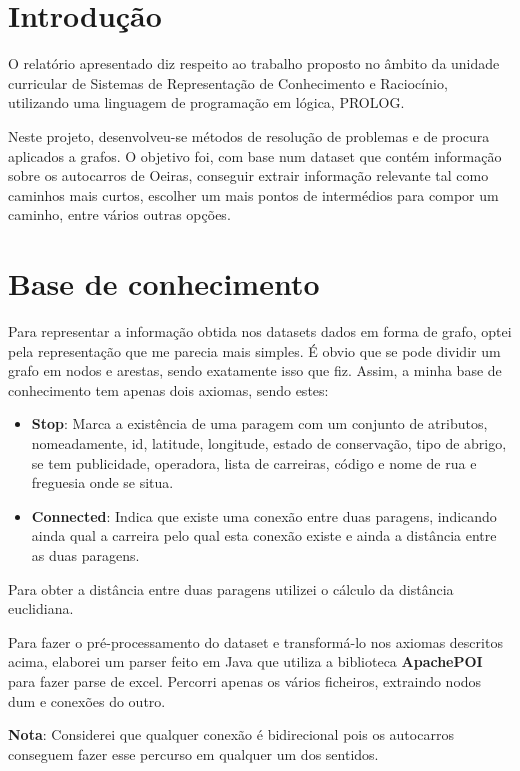 \documentclass[20pt]{article}
\begin{document}
\newpage
\tableofcontents
\newpage
\section{Introdução}

O relatório apresentado diz respeito ao trabalho proposto no âmbito da unidade curricular de Sistemas de Representação de Conhecimento e Raciocínio, utilizando uma linguagem de programação em lógica, PROLOG. 

Neste projeto, desenvolveu-se métodos de resolução de problemas e de procura aplicados a grafos. O objetivo foi, com base num dataset que contém informação sobre os autocarros de Oeiras, conseguir extrair informação relevante tal como caminhos mais curtos, escolher um mais pontos de intermédios para compor um caminho, entre vários outras opções.
\newpage

\section{Base de conhecimento}
Para representar a informação obtida nos datasets dados em forma de grafo, optei pela representação que me parecia mais simples. É obvio que se pode dividir um grafo em nodos e arestas, sendo exatamente isso que fiz. Assim, a minha base de conhecimento tem apenas dois axiomas, sendo estes:
\begin{itemize}
    \item \textbf{Stop}: Marca a existência de uma paragem com um conjunto de atributos, nomeadamente, id, latitude, longitude, estado de conservação, tipo de abrigo, se tem publicidade, operadora, lista de carreiras, código e nome de rua e freguesia onde se situa.
    \item \textbf{Connected}: Indica que existe uma conexão entre duas paragens, indicando ainda qual a carreira pelo qual esta conexão existe e ainda a distância entre as duas paragens.
\end{itemize}
Para obter a distância entre duas paragens utilizei o cálculo da distância euclidiana.

Para fazer o pré-processamento do dataset e transformá-lo nos axiomas descritos acima, elaborei um parser feito em Java que utiliza a biblioteca \textbf{ApachePOI} para fazer parse de excel. Percorri apenas os vários ficheiros, extraindo nodos dum e conexões do outro.

\textbf{Nota}: Considerei que qualquer conexão é bidirecional pois os autocarros conseguem fazer esse percurso em qualquer um dos sentidos.
\end{document}
